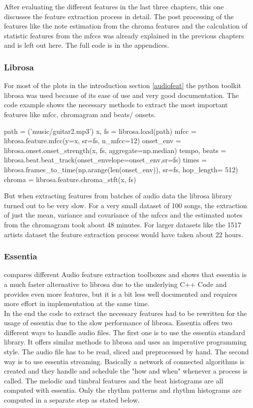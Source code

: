 After evaluating the different features in the last three chapters, this one discusses the feature extraction process in detail. The post processing of the features like the note estimation from the chroma features and the calculation of statistic features from the mfccs was already explained in the previous chapters and is left out here. The full code is in the appendices.

\subsubsection{Librosa}

For most of the plots in the introduction section \ref{audiofeat} the python toolkit librosa was used because of its ease of use and very good documentation. The code example shows the necessary methods to extract the most important features like mfcc, chromagram and beats/ onsets.
\lstset{language=Python} 
\begin{pythonCode}[frame=single,label={lst:librosa},caption={librosa},captionpos=b]
path = ('music/guitar2.mp3')
x, fs = librosa.load(path)
mfcc = librosa.feature.mfcc(y=x, sr=fs, n_mfcc=12)
onset_env = librosa.onset.onset_strength(x, fs, aggregate=np.median)
tempo, beats = librosa.beat.beat_track(onset_envelope=onset_env,sr=fs)
times = librosa.frames_to_time(np.arange(len(onset_env)), sr=fs, hop_length= 512)
chroma = librosa.feature.chroma_stft(x, fs)
\end{pythonCode}	
But when extracting features from batches of audio data the librosa library turned out to be very slow. For a very small dataset of 100 songs, the extraction of just the mean, variance and covariance of the mfccs and the estimated notes from the chromagram took about 48 minutes. 
For larger datasets like the 1517 artists dataset the feature extraction process would have taken about 22 hours. 

\subsubsection{Essentia}

\cite{audiofeattoolb} compares different Audio feature extraction toolboxes and shows that essentia is a much faster alternative to librosa due to the underlying C++ Code and provides even more features, but it is a bit less well documented and requires more effort in implementation at the same time.\\ 
In the end the code to extract the necessary features had to be rewritten for the usage of essentia due to the slow performance of librosa. Essentia offers two different ways to handle audio files. The first one is to use the essentia standard library. It offers similar methods to librosa and uses an imperative programming style. The audio file has to be read, sliced and preprocessed by hand. 
The second way is to use essentia streaming. Basically a network of connected algorithms is created and they handle and schedule the "how and when" whenever a process is called.
The melodic and timbral features and the beat histograms are all computed with essentia. Only the rhythm patterns and rhythm histograms are computed in a separate step as stated below. 

